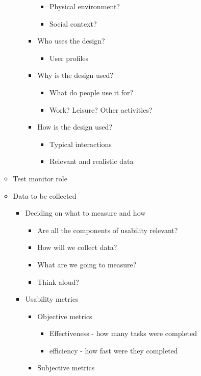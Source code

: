 \begin{itemize}
\begin{itemize}
\begin{itemize}
\begin{itemize}
				\begin{itemize}
					\item Physical environment?
					\item Social context?
				\end{itemize}
				\item Who uses the design?
				\begin{itemize}
					\item User profiles
				\end{itemize}
				\item Why is the design used?
				\begin{itemize}
					\item What do people use it for?
					\item Work? Leisure? Other activities?
				\end{itemize}
				\item How is the design used?
				\begin{itemize}
					\item Typical interactions
					\item Relevant and realistic data
				\end{itemize}
			\end{itemize}
		\end{itemize}
		\item Test monitor role
		\item Data to be collected
		\begin{itemize}
			\item Deciding on what to measure and how
			\begin{itemize}
				\item Are all the components of usability relevant?
				\item How will we collect data?
				\item What are we going to measure?
				\item Think aloud?
			\end{itemize}
			\item Usability metrics
			\begin{itemize}
				\item Objective metrics
				\begin{itemize}
					\item Effectiveness - how many tasks were completed
					\item efficiency - how fast were they completed
				\end{itemize}
				\item Subjective metrics

\end{itemize}
\end{itemize}
\end{itemize}
\end{itemize}

